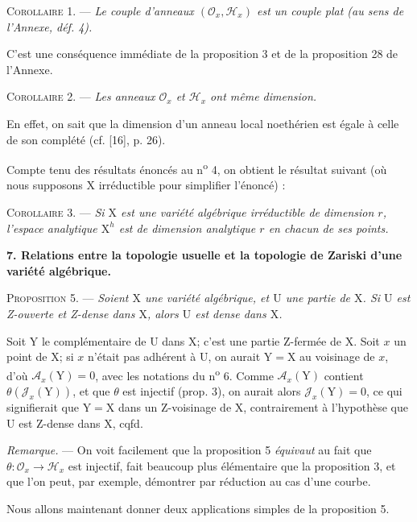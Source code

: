 \textsc{Corollaire} 1. — \textit{Le couple d'anneaux $(\mathcal{O}_x, \mathcal{H}_x)$ est un couple plat (au sens de l'Annexe, déf. 4).}

C'est une conséquence immédiate de la proposition 3 et de la proposition 28 de l'Annexe.

\textsc{Corollaire} 2. — \textit{Les anneaux $\mathcal{O}_x$ et $\mathcal{H}_x$ ont même dimension.}

En effet, on sait que la dimension d'un anneau local noethérien est égale à celle de son complété (cf. [16], p. 26).

Compte tenu des résultats énoncés au n\textsuperscript{o} 4, on obtient le résultat suivant (où nous supposons $\mathrm{X}$ irréductible pour simplifier l'énoncé) :

\textsc{Corollaire} 3. — \textit{Si $\mathrm{X}$ est une variété algébrique irréductible de dimension $r$, l'espace analytique $\mathrm{X}^h$ est de dimension analytique $r$ en chacun de ses points.}


\textbf{7. Relations entre la topologie usuelle et la topologie de Zariski d'une variété algébrique.}

\textsc{Proposition} 5. — \textit{Soient $\mathrm{X}$ une variété algébrique, et $\mathrm{U}$ une partie de $\mathrm{X}$. Si $\mathrm{U}$ est Z-ouverte et Z-dense dans $\mathrm{X}$, alors $\mathrm{U}$ est dense dans $\mathrm{X}$.}

Soit $\mathrm{Y}$ le complémentaire de $\mathrm{U}$ dans $\mathrm{X}$; c'est une partie Z-fermée de $\mathrm{X}$. Soit $x$ un point de $\mathrm{X}$; si $x$ n'était pas adhérent à $\mathrm{U}$, on aurait $\mathrm{Y} = \mathrm{X}$ au voisinage de $x$, d'où $\mathcal{A}_x(\mathrm{Y}) = 0$, avec les notations du n\textsuperscript{o} 6. Comme $\mathcal{A}_x(\mathrm{Y})$ contient $\theta(\mathcal{J}_x(\mathrm{Y}))$, et que $\theta$ est injectif (prop. 3), on aurait alors $\mathcal{J}_x(\mathrm{Y}) = 0$, ce qui signifierait que $\mathrm{Y} = \mathrm{X}$ dans un Z-voisinage de $\mathrm{X}$, contrairement à l'hypothèse que $\mathrm{U}$ est Z-dense dans $\mathrm{X}$, cqfd.

\textit{Remarque.} — On voit facilement que la proposition 5 \textit{équivaut} au fait que $\theta : \mathcal{O}_x \to \mathcal{H}_x$ est injectif, fait beaucoup plus élémentaire que la proposition 3, et que l'on peut, par exemple, démontrer par réduction au cas d'une courbe.

Nous allons maintenant donner deux applications simples de la proposition 5.


